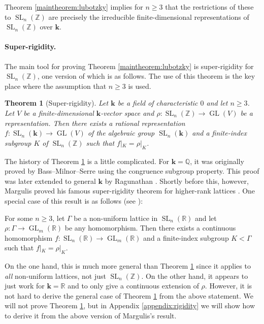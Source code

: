 \documentclass[11pt]{article}
\numberwithin{equation}{section}
\theoremstyle{plain}
\newtheorem{maintheorem}{Theorem}
\theoremstyle{definition}
\theoremstyle{remark}
\DeclareMathOperator{\GL}{GL}
\DeclareMathOperator{\SL}{SL}
\newcommand\R{\ensuremath{\mathbb{R}}}
\newcommand\Z{\ensuremath{\mathbb{Z}}}
\newcommand\Q{\ensuremath{\mathbb{Q}}}
\newcommand\bk{\ensuremath{\mathbf{k}}}
\begin{document}
Theorem \ref{maintheorem:lubotzky} implies for $n \geq 3$ that the restrictions of these to 
$\SL_n(\Z)$ are precisely the irreducible finite-dimensional representations of $\SL_n(\Z)$ over $\bk$.

\paragraph{Super-rigidity.}
The main tool for proving Theorem \ref{maintheorem:lubotzky} is super-rigidity for $\SL_n(\Z)$, one version
of which is as follows.  The use of this theorem is the key place where the assumption that $n \geq 3$ is
used.

\begin{maintheorem}[Super-rigidity]
\label{maintheorem:superrigidity}
Let $\bk$ be a field of characteristic $0$ and let $n \geq 3$.  
Let $V$ be a finite-dimensional $\bk$-vector space and $\rho\colon \SL_n(\Z) \rightarrow \GL(V)$
be a representation.  Then there exists a rational representation $f\colon \SL_n(\bk) \rightarrow \GL(V)$ of
the algebraic group $\SL_n(\bk)$ and a finite-index subgroup $K$ of $\SL_n(\Z)$ such that $f|_K = \rho|_K$.
\end{maintheorem}

The history of Theorem \ref{maintheorem:superrigidity} is a little complicated.
For $\bk = \Q$, it was originally proved by Bass--Milnor--Serre \cite{BassMilnorSerre}
using the congruence subgroup property.  This proof was later extended to general $\bk$ by
Ragunathan \cite{Ragunathan}.  Shortly before this, however, Margulis proved his famous
super-rigidity theorem for higher-rank lattices \cite{MargulisBook}.  One special case of this
result is as follows (see \cite[Theorem 16.1.1]{WitteBook}):
\begin{compactitem}
\item For some $n \geq 3$, let $\Gamma$ be a non-uniform lattice in $\SL_n(\R)$ and let
$\rho\colon \Gamma \rightarrow \GL_m(\R)$ be any homomorphism.  Then there exists a continuous
homomorphism $f\colon \SL_n(\R) \rightarrow \GL_m(\R)$ and a finite-index subgroup $K<\Gamma$
such that $f|_K = \rho|_K$.
\end{compactitem}
On the one hand, this is much more general than Theorem \ref{maintheorem:superrigidity} since it
applies to {\em all} non-uniform lattices, not just $\SL_n(\Z)$.  On the other hand, it
appears to just work for $\bk = \R$ and to only give a continuous extension of $\rho$.  However,
it is not hard to derive the general case of Theorem \ref{maintheorem:superrigidity} from the above statement.
We will not prove Theorem \ref{maintheorem:superrigidity}, but in Appendix \ref{appendix:rigidity} we will
show how to derive it from the above version of Margulis's result.
\end{document}
